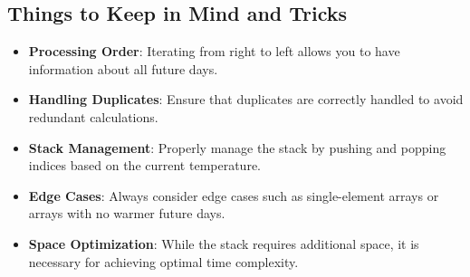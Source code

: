 \subsection*{Things to Keep in Mind and Tricks}
\begin{itemize}
    \item \textbf{Processing Order}: Iterating from right to left allows you to have information about all future days.
    
    \item \textbf{Handling Duplicates}: Ensure that duplicates are correctly handled to avoid redundant calculations.
    
    \item \textbf{Stack Management}: Properly manage the stack by pushing and popping indices based on the current temperature.
    
    \item \textbf{Edge Cases}: Always consider edge cases such as single-element arrays or arrays with no warmer future days.
    
    \item \textbf{Space Optimization}: While the stack requires additional space, it is necessary for achieving optimal time complexity.
\end{itemize}


